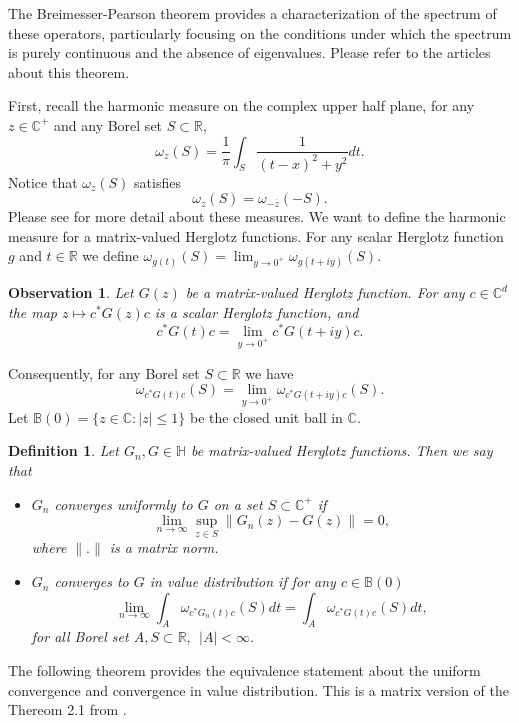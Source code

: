 \documentclass[reqno]{amsart}
\numberwithin{equation}{section}
\newcommand{\C}{\mathbb{C}}
\newcommand{\R}{\mathbb{R}}
\newtheorem{obs}{Observation}[section]
\newtheorem{defi}{Definition}[section]
\begin{document}
The Breimesser-Pearson theorem provides a characterization of the spectrum of these operators, particularly focusing on the conditions under which the spectrum is purely continuous and the absence of eigenvalues. Please refer to the articles \cite{BP1, BP2, Pearson} about this theorem.


First, recall the harmonic measure on the complex upper half plane, for any $z\in \C^+$ and any Borel set $S\subset \R$,  \begin{equation} \label{eq 4.3}\omega_z(S) = \frac{1}{\pi} \int_S \frac{1}{(t-x)^2 +y^2} dt. \end{equation} Notice that $ \omega_z(S)$ satisfies 
\begin{equation} \label{hmp}
\omega_z(S) = \omega_{-\overline{z}}(-S). 
\end{equation} 
Please see \cite{CR2} for more detail about these measures. We  want to define the harmonic measure for a matrix-valued Herglotz functions. For any scalar Herglotz function  
$g$ and $t\in \R $ we define $ \omega_{g(t)}(S) = \lim_{y \rightarrow 0^+} \omega_{g(t+iy)}(S).$ 

\begin{obs} Let  $G(z)$ be a matrix-valued Herglotz function. For any $c \in \C^d$ the map $z \mapsto c^*G(z)c$ is a scalar Herglotz function, and   $$ c^*G(t)c = \lim_{y \rightarrow 0^+} c^*G(t+iy)c.$$ \end{obs} Consequently, for any Borel set $S\subset \R$ we have
$$  \omega_{c^*G(t)c}(S) = \lim_{y \rightarrow 0^+} \omega_{c^*G(t+iy)c}(S).$$ 
Let $\mathbb B(0)= \{ z \in \C : |z| \leq 1 \}$ be the closed unit ball in $\C$.

\begin{defi} Let $ G_n, G \in \mathbb H $ be matrix-valued Herglotz functions. Then we say that

\begin{itemize}

\item $G_n$ converges uniformly to $ G$ on a set $ S \subset \C^+$ if 
$$ \lim_{n\rightarrow \infty} \sup _{z \in S} \| G_n(z) -G(z)\| = 0 ,$$ where $ \|.\|$ is a matrix norm.

\item $G_n$ converges  to $ G$ in value distribution if for any $c\in \mathbb B(0)$ 
\begin{equation}
\lim_{n\rightarrow \infty }  \int_A \omega_{c^*G_n(t)c}(S) dt = \int_A \omega_{c^*G(t)c}(S) dt ,
\end{equation} for all Borel set $A, S \subset \R ,\ \ |A| < \infty .$
\end{itemize}

\end{defi}
The following theorem provides the equivalence statement about the uniform convergence and convergence in value distribution. This is a matrix version of the Thereom 2.1 from \cite{CR1}.
\end{document}
